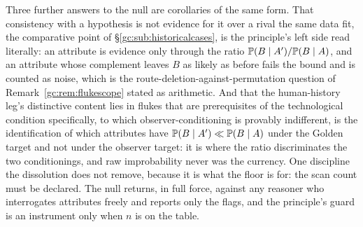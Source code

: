 \begin{remark}
Three further answers to the null are corollaries of the same
form. That consistency with a hypothesis is not evidence for it
over a rival the same data fit, the comparative point of
\S\ref{gc:sub:historicalcases}, is the principle's left side read
literally: an attribute is evidence only through the ratio
$\mathbb{P}(B\mid A')/\mathbb{P}(B\mid A)$, and an attribute whose complement leaves
$B$ as likely as before fails the bound and is counted as noise,
which is the route-deletion-against-permutation question of
Remark~\ref{gc:rem:flukescope} stated as arithmetic. And that the
human-history leg's distinctive content lies in flukes that are
prerequisites of the technological condition specifically, to which
observer-conditioning is provably indifferent, is the identification
of which attributes have $\mathbb{P}(B\mid A')\ll\mathbb{P}(B\mid A)$ under the
Golden target and not under the observer target: it is where the
ratio discriminates the two conditionings, and raw improbability
never was the currency. One discipline the dissolution does not
remove, because it is what the floor is for: the scan count must be
declared. The null returns, in full force, against any reasoner who
interrogates attributes freely and reports only the flags, and the
principle's guard is an instrument only when $n$ is on the table.
\end{remark}

